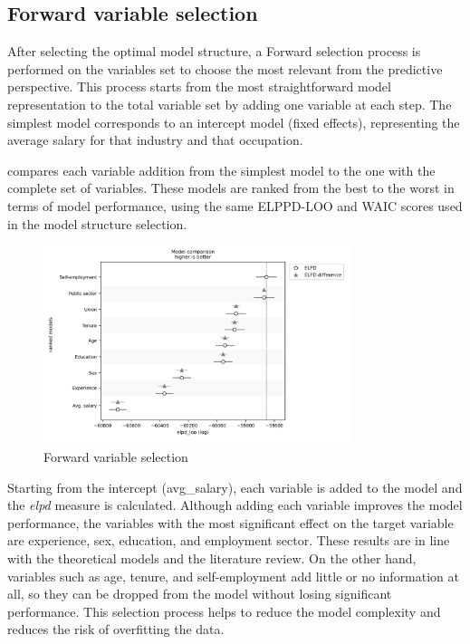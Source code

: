 \subsection{Forward variable selection} 

After selecting the optimal model structure, a Forward selection process is performed on the variables set to choose the most relevant from the predictive perspective. This process starts from the most straightforward model representation to the total variable set by adding one variable at each step. The simplest model corresponds to an intercept model (fixed effects), representing the average salary for that industry and that occupation. 

 compares each variable addition from the simplest model to the one with the complete set of variables. These models are ranked from the best to the worst in terms of model performance, using the same ELPPD-LOO and WAIC scores used in the model structure selection.

\begin{figure}[H]
    \centering
    \includegraphics[width=0.8\textwidth]{images/ch5_forward_sel/forward_sel.png}
    \setlength{\abovecaptionskip}{-5pt}
    \caption{Forward variable selection}
    \label{fig:forward_selection}
\end{figure}

Starting from the intercept (avg\_salary), each variable is added to the model and the \textit{elpd} measure is calculated. Although adding each variable improves the model performance, the variables with the most significant effect on the target variable are experience, sex, education, and employment sector. These results are in line with the theoretical models and the literature review. On the other hand, variables such as age, tenure, and self-employment add little or no information at all, so they can be dropped from the model without losing significant performance. This selection process helps to reduce the model complexity and reduces the risk of overfitting the data.

